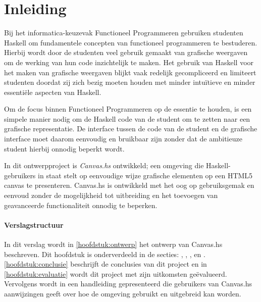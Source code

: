 \chapter{Inleiding}
Bij het informatica-keuzevak Functioneel Programmeren gebruiken studenten Haskell om fundamentele concepten van functioneel programmeren te bestuderen. Hierbij wordt door de studenten veel gebruik gemaakt van grafische weergaven om de werking van hun code inzichtelijk te maken. Het gebruik van Haskell voor het maken van grafische weergaven blijkt vaak redelijk gecompliceerd en limiteert studenten doordat zij zich bezig moeten houden met minder intuïtieve en minder essentiële aspecten van Haskell. 

Om de focus binnen Functioneel Programmeren op de essentie te houden, is een simpele manier nodig om de Haskell code van de student om te zetten naar een grafische representatie. De interface tussen de code van de student en de grafische interface moet daarom eenvoudig en bruikbaar zijn zonder dat de ambitieuze student hierbij onnodig beperkt wordt.

In dit ontwerpproject is \emph{Canvas.hs} ontwikkeld; een omgeving die Haskell-gebruikers in staat stelt op eenvoudige wijze grafische elementen op een HTML5 canvas te presenteren. Canvas.hs is ontwikkeld met het oog op gebruiksgemak en eenvoud zonder de mogelijkheid tot uitbreiding en het toevoegen van geavanceerde functionaliteit onnodig te beperken.

\subsubsection{Verslagstructuur}
In dit verslag wordt in \autoref{hoofdstuk:ontwerp} het ontwerp van Canvas.hs beschreven. Dit hoofdstuk is onderverdeeld in de secties: , , ,  en . \autoref{hoofdstuk:conclusie} beschrijft de conclusies van dit project en in \autoref{hoofdstuk:evaluatie} wordt dit project met zijn uitkomsten geëvalueerd. Vervolgens wordt in  een handleiding gepresenteerd die gebruikers van Canvas.hs aanwijzingen geeft over hoe de omgeving gebruikt en uitgebreid kan worden.


